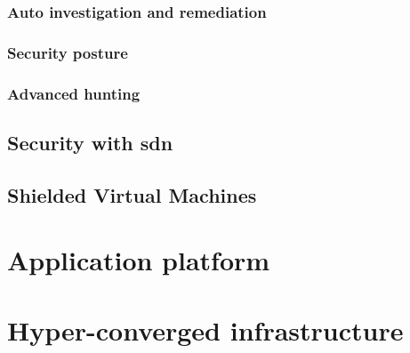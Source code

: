 \subsubsection{Auto investigation and remediation}
\subsubsection{Security posture}
\subsubsection{Advanced hunting}

\subsection{Security with \acrfull{sdn}}
\subsection{Shielded Virtual Machines}

\section{Application platform}

\section{Hyper-converged infrastructure}